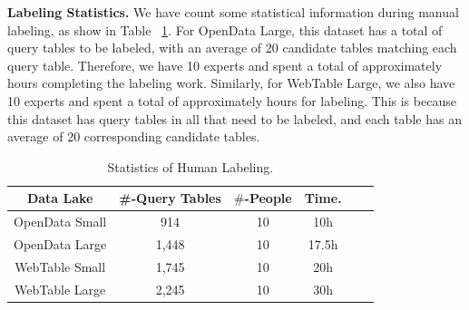 \noindent \textbf{Labeling Statistics.} 
We have count some statistical information during manual labeling, as show in Table ~\ref{Table:humanLabeling}. For OpenData Large, this dataset has a total of   query tables to be labeled, with an average of 20 candidate tables matching each query table. Therefore, we have 10 experts and spent a total of approximately  hours completing the labeling work. Similarly, for WebTable Large, we also have 10 experts and spent a total of approximately  hours for labeling. This is because this dataset has  query tables in all that need to be labeled, and each table has an average of 20 corresponding candidate tables.

\begin{table}[t]
	\centering
	\caption{Statistics of Human Labeling.}
	\begin{tabular}{|c|c|c|c|c|c|}
		\hline
		\centering
		Data Lake  & \#-Query Tables & $\#$-People & Time.   \\
		\hline  
		OpenData Small& 914  & 10 & 10h   \\
		\hline
		OpenData Large& 1,448  & 10  &  17.5h   \\
		\hline
		WebTable Small& 1,745   & 10 &  20h  \\
		\hline
		WebTable Large& 2,245  & 10 &  30h  \\
		\hline
	\end{tabular}
	\label{Table:humanLabeling}
	
\end{table}